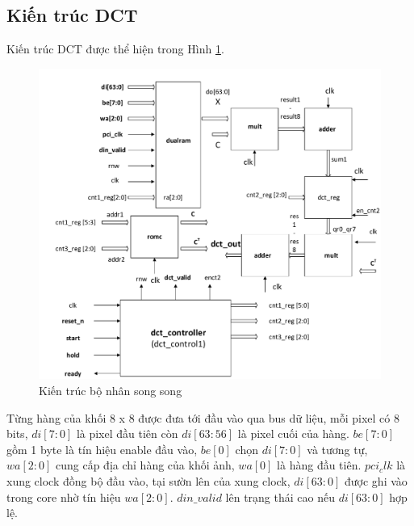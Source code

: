 \documentclass[conference]{IEEEtran}
\begin{document}
	\subsection{Kiến trúc DCT}
	Kiến trúc DCT được thể hiện trong Hình \ref{sys}.
	\begin{figure}[h]
		\includegraphics[width=\linewidth]{Figures/System.pdf}
		\caption{Kiến trúc bộ nhân song song} 
		\label{sys}
	\end{figure}
	Từng hàng của khối 8 x 8 được đưa tới đầu vào qua bus dữ liệu, mỗi pixel có 8 bits, $di[7:0]$ là pixel đầu tiên còn $di[63:56]$ là pixel cuối của hàng. $be[7:0]$ gồm 1 byte là tín hiệu enable đầu vào, $be[0]$ chọn $di[7:0]$ và tương tự, $wa[2:0]$ cung cấp địa chỉ hàng của khối ảnh, $wa[0]$ là hàng đầu tiên. $pci_clk$ là xung clock đồng bộ đầu vào, tại sườn lên của xung clock, $di[63:0]$ được ghi vào trong core nhờ tín hiệu $wa[2:0]$. $din\_valid$ lên trạng thái cao nếu $di[63:0]$ hợp lệ.\\
\end{document}
